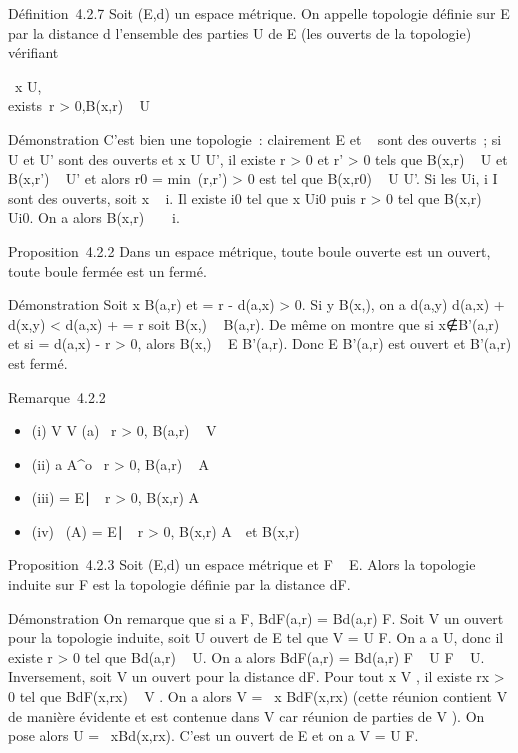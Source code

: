 Définition~4.2.7 Soit (E,d) un espace métrique. On appelle topologie
définie sur E par la distance d l'ensemble des parties U de E (les
ouverts de la topologie) vérifiant

\forall~x \in U, \\exists~r
\textgreater{} 0,\quad B(x,r) \subset~ U

Démonstration C'est bien une topologie~: clairement E et \varnothing~ sont des
ouverts~; si U et U' sont des ouverts et x \in U \bigcap U', il existe r
\textgreater{} 0 et r' \textgreater{} 0 tels que B(x,r) \subset~ U et B(x,r') \subset~
U' et alors r0 = min~(r,r')
\textgreater{} 0 est tel que B(x,r0) \subset~ U \bigcap U'. Si les
Ui, i \in I sont des ouverts, soit x
\in\⋃ ~
i\inIUi. Il existe i0 tel que x \in
Ui0 puis r \textgreater{} 0 tel que B(x,r) \subset~
Ui0. On a alors B(x,r)
\subset~\⋃ ~
i\inIUi.

Proposition~4.2.2 Dans un espace métrique, toute boule ouverte est un
ouvert, toute boule fermée est un fermé.

Démonstration Soit x \in B(a,r) et \rho = r - d(a,x) \textgreater{} 0. Si y \in
B(x,\rho), on a d(a,y) \leq d(a,x) + d(x,y) \textless{} d(a,x) + \rho = r soit
B(x,\rho) \subset~ B(a,r). De même on montre que si
x∉B'(a,r) et si \rho = d(a,x) - r \textgreater{}
0, alors B(x,\rho) \subset~ E \diagdown B'(a,r). Donc E \diagdown B'(a,r) est ouvert et B'(a,r)
est fermé.

Remarque~4.2.2

\begin{itemize}
\itemsep1pt\parskip0pt
\item
  (i) V \in V (a) \Leftrightarrow
  \exists~r \textgreater{} 0, B(a,r) \subset~ V
\item
  (ii) a \in A^o \Leftrightarrow
  \exists~r \textgreater{} 0, B(a,r) \subset~ A
\item
  (iii) \overlineA = \x \in
  E∣\forall~~r
  \textgreater{} 0, B(x,r) \bigcap
  A\neq~\varnothing~\
\item
  (iv) \mathrmFr~(A) =
  \x \in
  E∣\forall~~r
  \textgreater{} 0, B(x,r) \bigcap
  A\neq~\varnothing~\text et B(x,r)
  \bigcapcA\neq~\varnothing~\
\end{itemize}

Proposition~4.2.3 Soit (E,d) un espace métrique et F \subset~ E. Alors la
topologie induite sur F est la topologie définie par la distance
dF.

Démonstration On remarque que si a \in F, BdF(a,r) =
Bd(a,r) \bigcap F. Soit V un ouvert pour la topologie induite, soit
U ouvert de E tel que V = U \bigcap F. On a a \in U, donc il existe r
\textgreater{} 0 tel que Bd(a,r) \subset~ U. On a alors
BdF(a,r) = Bd(a,r) \bigcap F \subset~ U \bigcap F \subset~ U.
Inversement, soit V un ouvert pour la distance dF. Pour tout x
 , il existe rx \textgreater{} 0 tel que
BdF(x,rx) \subset~ V . On a alors V
= \⋃  ~x\inV
BdF(x,rx) (cette réunion contient V de
manière évidente et est contenue dans V car réunion de parties de V ).
On pose alors U =\ \⋃
 x\inV Bd(x,rx). C'est un ouvert de E et
on a V = U \bigcap F.

